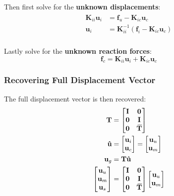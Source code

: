 \documentclass[10pt,b5paper,titlepage]{book}
\newcommand{\m}{\mathbf}
\newcommand{\closure}[2][3]{%
{}\mkern#1mu\overline{\mkern-#1mu#2}}
\newenvironment{eqarray}
{
    \begin{eqnarray}
        \begin{aligned}
}
{
        \end{aligned}
    \end{eqnarray}
}
\begin{document}
Then first solve for the \textbf{unknown displacements}:
\begin{eqarray}
    \m{K}_{ii} \boxed{\m{u}_i} &= \m{f}_u - \m{K}_{ic} \m{u}_c \\
    \boxed{\m{u}_i} &= \m{K}_{ii}^{-1} \left( \m{f}_i - \m{K}_{ic} \m{u}_c \right) \\
\end{eqarray}

Lastly solve for the \textbf{unknown reaction forces}:
\begin{equation}
    \boxed{\m{f}_c} = \m{K}_{ii} \m{u}_i + \m{K}_{ic} \m{u}_c
\end{equation}


\subsubsection{Recovering Full Displacement Vector}

The full displacement vector is then recovered:
\begin{eqarray}
    \m{T} &= \begin{bmatrix}
        \m{I} & \m{0} \\
        \m{0} & \m{I} \\
        \m{0} & \m{\closure{T}} \\
    \end{bmatrix} \\
    \m{\hat{u}} &= \begin{bmatrix}
        \m{u}_i \\
        \m{u}_c \\
    \end{bmatrix}
    = \begin{bmatrix}
        \m{u}_u \\
        \m{u}_m \\
    \end{bmatrix} \\
    \m{u}_g &= \m{T} \m{\hat{u}} \\
    \begin{bmatrix}
        \m{u}_u \\
        \m{u}_m \\
        \m{u}_s \\
    \end{bmatrix}
    &= \begin{bmatrix}
        \m{I} & \m{0} \\
        \m{0} & \m{I} \\
        \m{0} & \m{\closure{T}} \\
    \end{bmatrix}
    \begin{bmatrix}
        \m{u}_u \\
        \m{u}_m \\
    \end{bmatrix}
\end{eqarray}
\end{document}
